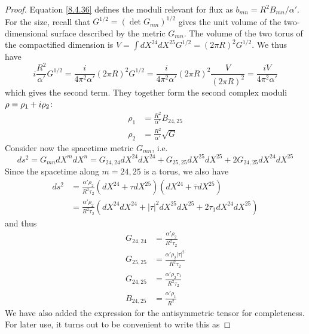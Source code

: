 \begin{tcolorbox}[breakable]
\begin{proof}
		Equation \eqref{8.4.36} defines the moduli relevant for flux as $b_{mn} = R^2 B_{mn}/\alpha'$. For the size, recall that $G^{1/2} = (\det G_{mn})^{1/2}$ gives the unit volume of the two-dimensional surface described by the metric $G_{mn}$. The volume of the two torus of the compactified dimension is $V = \int dX^{24}dX^{25} G^{1/2} = (2\pi R)^2 G^{1/2}$. We thus have
		\begin{equation}
			i \frac{R^2}{\alpha'} G^{1/2} = \frac{i}{4\pi^2 \alpha'} (2\pi R)^2 G^{1/2} = \frac{i}{4\pi^2 \alpha'} (2\pi R)^2 \frac{V}{(2\pi R)^2} = \frac{iV}{4\pi^2 \alpha'}
		\end{equation}
		which gives the second term. They together form the second complex moduli $\rho=\rho_1+i\rho_2$:
		\begin{equation}
			\begin{aligned}
				\rho_1 &= \frac{R^2}{\alpha'} B_{24,25} \\
				\rho_2 &= \frac{R^2}{\alpha'} \sqrt{G}
			\end{aligned}
		\end{equation}
		Consider now the spacetime metric $G_{mn}$, i.e.
		\begin{equation}
			ds^2 = G_{mn} dX^m dX^n = G_{24,24} dX^{24} dX^{24} + G_{25,25} dX^{25} dX^{25} + 2G_{24,25} dX^{24} dX^{25}
		\end{equation}
		Since the spacetime along $m=24,25$ is a torus, we also have
		\begin{equation}
			\begin{aligned}
				ds^2 &= \frac{\alpha' \rho_2}{R^2 \tau_2} (dX^{24} + \tau dX^{25})(dX^{24} + \bar{\tau} dX^{25}) \\
				&= \frac{\alpha' \rho_2}{R^2 \tau_2} (dX^{24} dX^{24} + |\tau|^2 dX^{25} dX^{25} + 2\tau_1 dX^{24} dX^{25})
			\end{aligned}
		\end{equation}
		and thus
		\begin{equation}
			\begin{aligned}
				G_{24,24} &= \frac{\alpha' \rho_2}{R^2 \tau_2} \\
				G_{25,25} &= \frac{\alpha' \rho_2 |\tau|^2}{R^2 \tau_2} \\
				G_{24,25} &= \frac{\alpha' \rho_2 \tau_1}{R^2 \tau_2} \\
				B_{24,25} &= \frac{\alpha' \rho_1}{R^2}
			\end{aligned}
		\end{equation}
		We have also added the expression for the antisymmetric tensor for completeness. For later use, it turns out to be convenient to write this as

\end{proof}
\end{tcolorbox}
